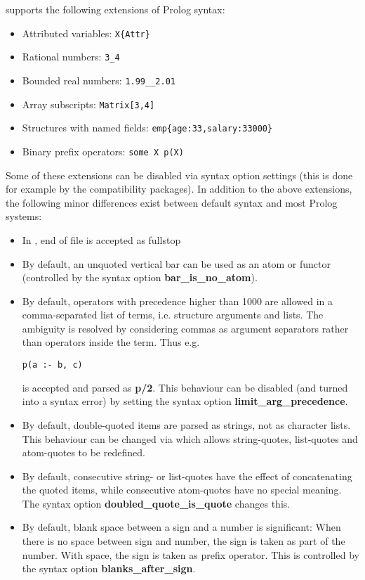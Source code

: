 {\eclipse} supports the following extensions of Prolog syntax:
\begin{itemize}
\item Attributed variables: \verb.X{Attr}.
\item Rational numbers: \verb.3_4.
\item Bounded real numbers: \verb+1.99__2.01+
\item Array subscripts: \verb.Matrix[3,4].
\item Structures with named fields: \verb.emp{age:33,salary:33000}.
\item Binary prefix operators: \verb.some X p(X).
\end{itemize}
Some of these extensions can be disabled via syntax option settings
(this is done for example by the compatibility packages).
In addition to the above extensions, the following minor differences
exist between default {\eclipse} syntax and most Prolog systems:
\begin{itemize}
\item In {\eclipse}, end of file is accepted as fullstop

\item By default, an unquoted vertical bar can be used as an atom or
    functor (controlled by the syntax option {\bf bar_is_no_atom}).

\item By default, operators with precedence higher than 1000 are allowed
    in a comma-separated list of terms, i.e. structure arguments
    and lists. The ambiguity is resolved by considering commas
    as argument separators rather than operators inside the term.
    Thus e.g.
\begin{verbatim}
p(a :- b, c)
\end{verbatim}
    is accepted and parsed as {\bf p/2}. This behaviour can be disabled
    (and turned into a syntax error) by setting the syntax option
    {\bf limit_arg_precedence}.

\item By default, double-quoted items are parsed as strings, not as character
    lists.  This behaviour can be changed via
    which allows string-quotes, list-quotes and atom-quotes to be redefined.

\item By default, consecutive string- or list-quotes have the effect of
    concatenating the quoted items, while consecutive atom-quotes have
    no special meaning. The syntax option {\bf doubled_quote_is_quote}
    changes this.

\item By default, blank space between a sign and a number is significant:
    When there is no space between sign and number, the sign is taken as
    part of the number. With space, the sign is taken as prefix operator.
    This is controlled by the syntax option {\bf blanks_after_sign}.
\end{itemize}


